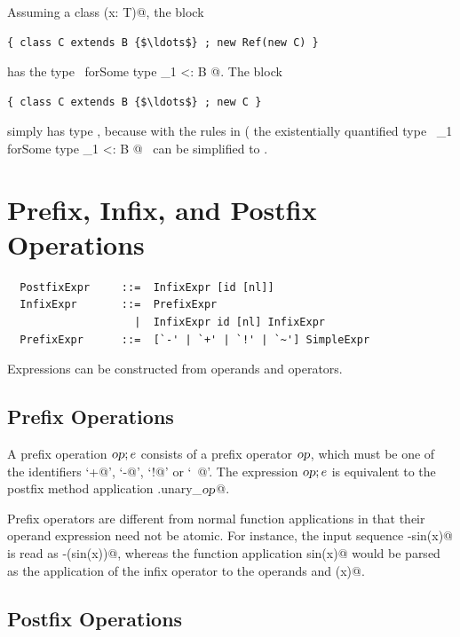 \example
Assuming a class \lstinline@Ref[T](x: T)@, the block
\begin{lstlisting}
{ class C extends B {$\ldots$} ; new Ref(new C) }
\end{lstlisting}
has the type ~\lstinline@Ref[_1] forSome { type _1 <: B }@.
The block
\begin{lstlisting}
{ class C extends B {$\ldots$} ; new C }
\end{lstlisting}
simply has type , because with the rules in
( the existentially quantified type 
~\lstinline@_1 forSome { type _1 <: B }@~ can be simplified to .


\section{Prefix, Infix, and Postfix Operations}
\label{sec:infix-operations}

\syntax\begin{lstlisting}
  PostfixExpr     ::=  InfixExpr [id [nl]]
  InfixExpr       ::=  PrefixExpr
                    |  InfixExpr id [nl] InfixExpr
  PrefixExpr      ::=  [`-' | `+' | `!' | `~'] SimpleExpr 
\end{lstlisting}

Expressions can be constructed from operands and operators. 

\subsection{Prefix Operations}

A prefix operation $\mbox{\sl op};e$ consists of a prefix operator $\mbox{\sl op}$, which
must be one of the identifiers `\lstinline@+@', `\lstinline@-@',
`\lstinline@!@' or `\lstinline@~@'. The expression $\mbox{\sl op};e$ is
equivalent to the postfix method application
\lstinline@e.unary_$\mbox{\sl op}$@.


Prefix operators are different from normal function applications in
that their operand expression need not be atomic. For instance, the
input sequence \lstinline@-sin(x)@ is read as \lstinline@-(sin(x))@, whereas the
function application \lstinline@negate sin(x)@ would be parsed as the
application of the infix operator  to the operands
 and \lstinline@(x)@.

\subsection{Postfix Operations}

